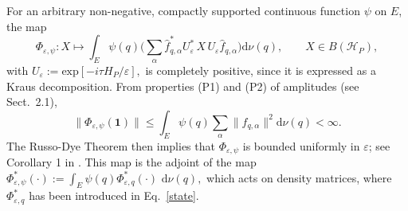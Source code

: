\documentclass[11pt]{article}
\newcommand{\id}{\mathbf{1}}
\begin{document}
For an arbitrary non-negative, compactly supported continuous function $\psi$ on $E$, the map
$$\Phi_{\varepsilon, \psi}: X \mapsto \int_{E} \psi(q) \Big(\sum_{\alpha} \widehat{f}_{q,\alpha}^{*} U_{\varepsilon}^{*}\, X\, U_{\varepsilon} \widehat{f}_{q, \alpha}\Big) \text{d}\nu(q), \qquad X\in B(\mathcal{H}_P),$$
with $U_{\varepsilon}:= \text{exp}[-i\tau H_{P}/\varepsilon],$ is completely positive, since it is expressed as
a Kraus decomposition. From properties (P1) and (P2) of amplitudes (see Sect.~2.1), 
$$\|\Phi_{\varepsilon,\psi}(\id)\|\leq \int_E\psi(q)\sum_\alpha\|f_{q,\alpha}\|^2\mathrm{d}\nu(q)<\infty.$$
The Russo-Dye Theorem then implies that $\Phi_{\varepsilon,\psi}$ is bounded uniformly in $\varepsilon$;
see Corollary 1 in \cite{RD}. This map is the adjoint of the map 
$\Phi_{\varepsilon, \psi}^{*}(\cdot):=\int_{E}\psi(q) \Phi_{\varepsilon, q}^{*}(\cdot)\text{ d}\nu(q),$ which acts on density matrices,
where $\Phi_{\varepsilon,q}^{*}$ has been introduced in Eq.~\eqref{state}.
\end{document}
